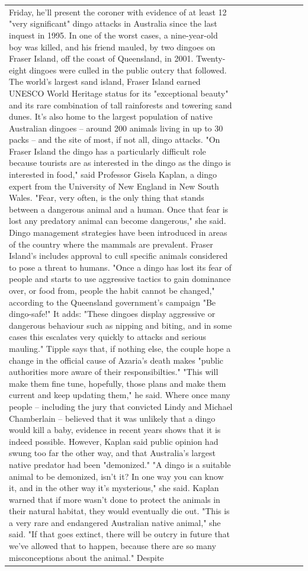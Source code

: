 \begin{table}[H]
\begin{tabular}{lllrlllll}
Friday, he'll present the coroner with evidence of at least 12 "very significant" dingo attacks in Australia since the last inquest in 1995. In one of the worst cases, a nine-year-old boy was killed, and his friend mauled, by two dingoes on Fraser Island, off the coast of Queensland, in 2001. Twenty-eight dingoes were culled in the public outcry that followed. The world's largest sand island, Fraser Island earned UNESCO World Heritage status for its "exceptional beauty" and its rare combination of tall rainforests and towering sand dunes. It's also home to the largest population of native Australian dingoes -- around 200 animals living in up to 30 packs -- and the site of most, if not all, dingo attacks. "On Fraser Island the dingo has a particularly difficult role because tourists are as interested in the dingo as the dingo is interested in food," said Professor Gisela Kaplan, a dingo expert from the University of New England in New South Wales. "Fear, very often, is the only thing that stands between a dangerous animal and a human. Once that fear is lost any predatory animal can become dangerous," she said. Dingo management strategies have been introduced in areas of the country where the mammals are prevalent. Fraser Island's includes approval to cull specific animals considered to pose a threat to humans. "Once a dingo has lost its fear of people and starts to use aggressive tactics to gain dominance over, or food from, people the habit cannot be changed," according to the Queensland government's campaign "Be dingo-safe!" It adds: "These dingoes display aggressive or dangerous behaviour such as nipping and biting, and in some cases this escalates very quickly to attacks and serious mauling." Tipple says that, if nothing else, the couple hope a change in the official cause of Azaria's death makes "public authorities more aware of their responsibilties." "This will make them fine tune, hopefully, those plans and make them current and keep updating them," he said. Where once many people -- including the jury that convicted Lindy and Michael Chamberlain -- believed that it was unlikely that a dingo would kill a baby, evidence in recent years shows that it is indeed possible. However, Kaplan said public opinion had swung too far the other way, and that Australia's largest native predator had been "demonized." "A dingo is a suitable animal to be demonized, isn't it? In one way you can know it, and in the other way it's mysterious," she said. Kaplan warned that if more wasn't done to protect the animals in their natural habitat, they would eventually die out. "This is a very rare and endangered Australian native animal," she said. "If that goes extinct, there will be outcry in future that we've allowed that to happen, because there are so many misconceptions about the animal." Despite \\

\end{tabular}
\end{table}
